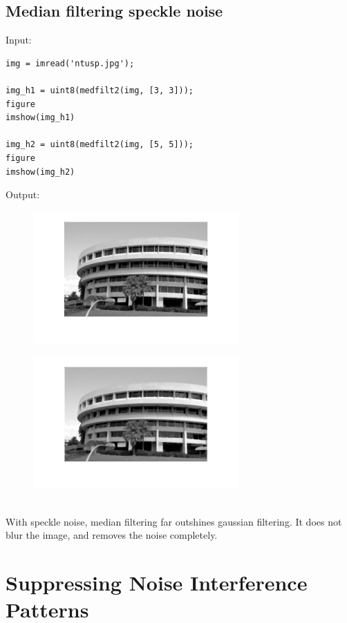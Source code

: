\documentclass[12pt, a4paper]{article}
\begin{document}
\subsection{Median filtering speckle noise}
Input:
\begin{verbatim}
img = imread('ntusp.jpg');

img_h1 = uint8(medfilt2(img, [3, 3]));
figure
imshow(img_h1)

img_h2 = uint8(medfilt2(img, [5, 5]));
figure
imshow(img_h2)
\end{verbatim}
\newpage
Output:
\begin{figure}[H]
    \centering
    \includegraphics[width=0.7\textwidth]{fig19.png}
\end{figure}
\begin{figure}[H]
    \centering
    \includegraphics[width=0.7\textwidth]{fig20.png}
\end{figure}
~\\
With speckle noise, median filtering far outshines gaussian filtering. It does not blur the image, and removes the noise completely.
\newpage
\section{Suppressing Noise Interference Patterns}
\end{document}
